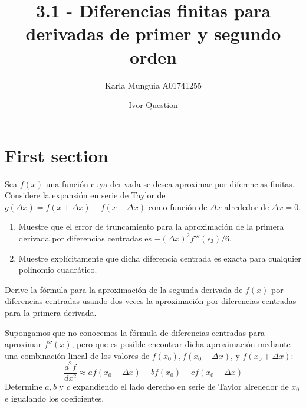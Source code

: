 \documentclass[11pt]{article} %
\title{3.1 - Diferencias finitas para derivadas de primer y segundo orden}
\author{Karla Munguia A01741255 \and  Ivor Question}
\begin{document}
\maketitle

\section{First section}

Sea $f(x)$ una función cuya derivada se desea aproximar por diferencias finitas. Considere la expansión en serie de Taylor de 
$g(\Delta x) = f(x+\Delta x) - f(x-\Delta x)$ como función de $\Delta x$ alrededor de $\Delta x = 0$. 
\begin{enumerate}
\item Muestre que el error de truncamiento para la aproximación de la primera derivada por diferencias centradas es 
$-(\Delta x)^2 f'''(\epsilon_3)/6$.
\item Muestre explícitamente que dicha diferencia centrada es exacta para cualquier polinomio cuadrático.
\end{enumerate}


Derive la fórmula para la aproximación de la segunda derivada de $f(x)$ por diferencias centradas usando dos veces la aproximación por diferencias centradas para la primera derivada.


Supongamos que no conocemos la fórmula de diferencias centradas para aproximar $f''(x)$, pero que es posible encontrar dicha aproximación mediante una combinación lineal de los valores de $f(x_0), f(x_0 - \Delta x)$, y $f(x_0 + \Delta x)$:
$$
\frac{d^2f}{dx^2} \approx af(x_0 - \Delta x) + bf(x_0) + cf(x_0 + \Delta x)
$$
Determine $a,b$ y $c$ expandiendo el lado derecho en serie de Taylor alrededor de $x_0$ e igualando los coeficientes.
\end{document}
